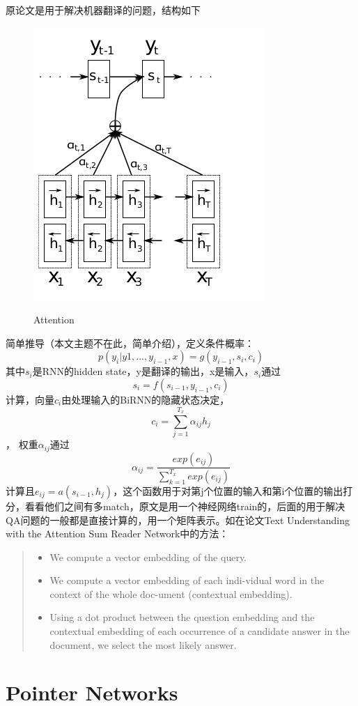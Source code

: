 \documentclass[UTF8]{article}
\begin{document}
原论文是用于解决机器翻译的问题，结构如下
\begin{figure}[htpb]
    \centering
    \includegraphics[width=0.5\linewidth]{attention.png}
    \label{fig:Attention}
    \caption{Attention}
\end{figure}
简单推导（本文主题不在此，简单介绍），定义条件概率：
$$p(y_i|y1,...,y_{i-1},x)=g(y_{i-1},s_i,c_i)$$
其中$s_i$是RNN的hidden state，y是翻译的输出，x是输入，$s_i$通过 $$s_i=f(s_{i-1},y_{i-1},c_i)$$
计算，向量$c_i$由处理输入的BiRNN的隐藏状态决定，
$$c_i=\sum_{j=1}^{T_x}\alpha_{ij}h_j$$，
权重$\alpha_{ij}$通过
$$\alpha_{ij}=\frac{exp(e_{ij})}{\sum_{k=1}^{T_x}exp(e_{ij})}$$
计算且$e_{ij}=a(s_{i-1},h_j)$，这个函数用于对第j个位置的输入和第i个位置的输出打分，看看他们之间有多match，原文是用一个神经网络train的，后面的用于解决QA问题的一般都是直接计算的，用一个矩阵表示。如在论文Text Understanding with the Attention Sum Reader Network中的方法：
\begin{quotation}
\noindent \begin{itemize}
    \item We compute a vector embedding of the query.

    \item We compute a vector embedding of each indi-vidual word in the context of the whole doc-ument (contextual embedding).

    \item Using a dot product between the question embedding and the contextual embedding of each occurrence of a candidate answer in the document, we select the most likely answer.
\end{itemize}
\end{quotation}

\section{Pointer Networks}
\end{document}
